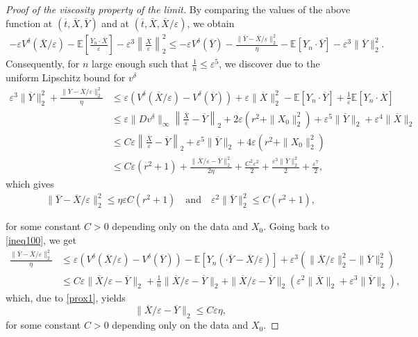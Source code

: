 \documentclass[reqno,11pt]{amsart}
\numberwithin{equation}{section}
\newcommand{\be}{\begin{equation}}
\newcommand{\ee}{\end{equation}}
\newcommand{\e}{\varepsilon}
\newcommand{\nd}{\noindent}
\begin{document}
\begin{proof}[Proof of the viscosity property of the limit]
    By comparing the values of the above function at $(\overline{t},\overline{X},\overline{Y})$ and at $(\overline{t},\overline{X},\overline{X}/\e)$, we obtain
    \begin{align}
        -\e V^\delta(\overline{X}/\e)-\mathbb{E}\left[ \frac{Y_n\cdot \overline{X}}{\e}   \right] -\e^3\left\|\frac{\overline{X}}{\e}\right\|_2^2\le -\e V^\delta(\overline{Y})-\frac{\|\overline{Y}-\overline{X}/\e\|_2^2}{\eta}-\mathbb{E}[Y_n\cdot \overline{Y}]-\e^3\|\overline{Y}\|_2^2.\label{ineq100}
    \end{align}
    Consequently, for $n$ large enough such that $\frac{1}{n}\le \e^5$, we discover due to the uniform Lipschitz bound for $v^\delta$
    \begin{align*}
        \e^3\|\overline{Y}\|_2^2+\frac{\|\overline{Y}-\overline{X}/\e\|_2^2}{\eta}&\le \e\left(V^\delta(\overline{X}/\e)- V^\delta(\overline{Y})\right)+\e\|\overline{X}\|_2^2-\mathbb{E}[Y_n\cdot \overline{Y}]+\frac{1}{\e}\mathbb{E}[Y_n\cdot \overline{X}]\\
        &\le \e\|Dv^{\delta}\|_{\infty}\left\|\frac{\overline{X}}{\e}-\overline{Y}  \right\|_2 +2\e(r^2+\|X_0\|_2^2)+\e^5\|\overline{Y}\|_2+\e^4\|\overline{X}\|_2\\
        &\le C\e\left\|\frac{\overline{X}}{\e}-\overline{Y}  \right\|_2+ \e^5\|\overline{Y}\|_2+4\e(r^2+\|X_0\|_2^2)\\
        &\le C\e(r^2+1) +\frac{\|\overline{X}/\e-\overline{Y}\|_2^2}{2\eta}+\frac{C^2\e^2}{2}+\frac{\e^3\|\overline{Y}\|_2^2}{2}+\frac{\e^7}{2},
    \end{align*}
    which gives
    \begin{align}
        \|\overline{Y}-\overline{X}/\e\|_2^2\le \eta\e C(r^2+1) \quad\text{and}\quad \e^2\|\overline{Y}\|_2^2\le C(r^2+1),\label{prox1}
    \end{align}

    \nd
    for some constant $C>0$ depending only on the data and $X_0$. Going back to \eqref{ineq100}, we get
    \begin{align*}
        \frac{\|\overline{Y}-\overline{X}/\e\|_2^2}{\eta}&\le \e\left(V^\delta(\overline{X}/\e)- V^\delta(\overline{Y})\right)-\mathbb{E}[Y_n(\cdot \overline{Y}-\overline{X}/\e)]+\e^3\left(\|\overline{X}/\e\|_2^2-\|\overline{Y}\|_2^2\right)\\
        &\le C\e\|\overline{X}/\e-\overline{Y}\|_2+\frac{1}{n}\|\overline{X}/\e-\overline{Y}\|_2+\|\overline{X}/\e-\overline{Y}\|_2\left(\e^2\|\overline{X}\|_2+\e^3\|\overline{Y}\|_2\right),
    \end{align*}
    which, due to \eqref{prox1}, yields
    \be\label{prox2}
\|\overline{X}/\e-\overline{Y}\|_2\le C\e\eta,
    \ee
    for some constant $C>0$ depending only on the data and $X_0$.
    \vspace{1mm}


\end{proof}
\end{document}
